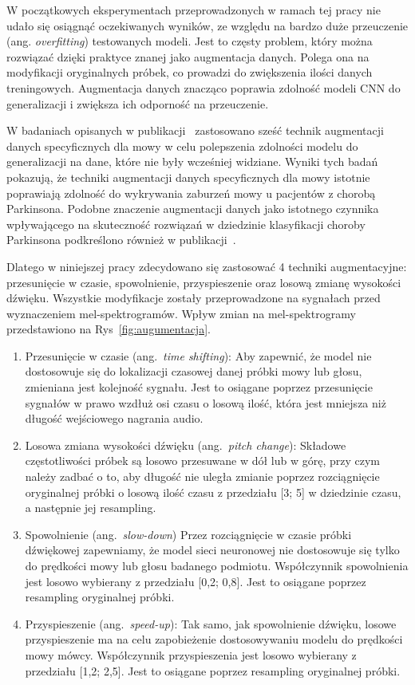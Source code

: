 W początkowych eksperymentach przeprowadzonych w ramach tej pracy nie udało się osiągnąć oczekiwanych wyników, ze względu na bardzo duże przeuczenie (ang. \emph{overfitting}) testowanych modeli.
Jest to częsty problem, który można rozwiązać dzięki praktyce znanej jako augmentacja danych.
Polega ona na modyfikacji oryginalnych próbek, co prowadzi do zwiększenia ilości danych treningowych.
Augmentacja danych znacząco poprawia zdolność modeli CNN do generalizacji i zwiększa ich odporność na przeuczenie.

W badaniach opisanych w publikacji~\cite{augmentation} zastosowano sześć technik augmentacji danych specyficznych dla mowy w celu polepszenia zdolności modelu do generalizacji na dane, które nie były wcześniej widziane.
Wyniki tych badań pokazują, że techniki augmentacji danych specyficznych dla mowy istotnie poprawiają zdolność do wykrywania zaburzeń mowy u pacjentów z chorobą Parkinsona.
Podobne znaczenie augmentacji danych jako istotnego czynnika wpływającego na skuteczność rozwiązań w dziedzinie klasyfikacji choroby Parkinsona podkreślono również w publikacji~\cite{Wodzinski}.

Dlatego w niniejszej pracy zdecydowano się zastosować 4 techniki augmentacyjne: przesunięcie w czasie, spowolnienie, przyspieszenie oraz losową zmianę wysokości dźwięku.
Wszystkie modyfikacje zostały przeprowadzone na sygnałach przed wyznaczeniem mel-spektrogramów.
Wpływ zmian na mel-spektrogramy przedstawiono na Rys~\ref{fig:augumentacja}.


\begin{enumerate}[label={\alph*)}]
	\item Przesunięcie w czasie (ang.~\emph{time shifting}): Aby zapewnić, że model nie dostosowuje się do lokalizacji czasowej danej próbki mowy lub głosu, zmieniana jest kolejność sygnału.
Jest to osiągane poprzez przesunięcie sygnałów w prawo wzdłuż osi czasu o losową ilość, która jest mniejsza niż długość wejściowego nagrania audio.
    \item Losowa zmiana wysokości dźwięku (ang.~\emph{pitch change}): Składowe częstotliwości próbek są losowo przesuwane w dół lub w górę, przy czym należy zadbać o to, aby długość nie uległa zmianie poprzez rozciągnięcie oryginalnej próbki o losową ilość czasu z przedziału [3; 5] w dziedzinie czasu, a następnie jej resampling.
    \item Spowolnienie (ang.~\emph{slow-down})
Przez rozciągnięcie w czasie próbki dźwiękowej zapewniamy, że model sieci neuronowej nie dostosowuje się tylko do prędkości mowy lub głosu badanego podmiotu.
Współczynnik spowolnienia jest losowo wybierany z przedziału [0,2; 0,8].
Jest to osiągane poprzez resampling oryginalnej próbki.
    \item Przyspieszenie (ang.~\emph{speed-up}): Tak samo, jak spowolnienie dźwięku, losowe przyspieszenie ma na celu zapobieżenie dostosowywaniu modelu do prędkości mowy mówcy.
Współczynnik przyspieszenia jest losowo wybierany z przedziału [1,2; 2,5].
Jest to osiągane poprzez resampling oryginalnej próbki.
\end{enumerate}


